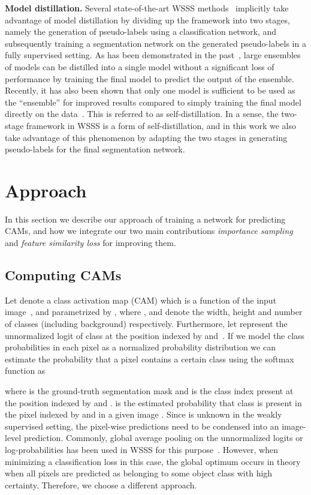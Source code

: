\documentclass{article}
\begin{document}
\textbf{Model distillation.} Several state-of-the-art WSSS methods~\cite{wang2020cvpr, lee2019cvpr, liu2020tpami} implicitly take advantage of model distillation by dividing up the framework into two stages, namely the generation of pseudo-labels using a classification network, and subsequently training a segmentation network on the generated pseudo-labels in a fully supervised setting. As has been demonstrated in the past~\cite{bucilua2006sigkdd, hinton2015arxiv}, large ensembles of models can be distilled into a single model without a significant loss of performance by training the final model to predict the output of the ensemble. Recently, it has also been shown that only one model is sufficient to be used as the ``ensemble'' for improved results compared to simply training the final model directly on the data~\cite{allen2020arxiv}. This is referred to as self-distillation. In a sense, the two-stage framework in WSSS is a form of self-distillation, and in this work we also take advantage of this phenomenon by adapting the two stages in generating pseudo-labels for the final segmentation network.

\section{Approach}

In this section we describe our approach of training a network for predicting CAMs, and how we integrate our two main contributions \textit{importance sampling} and \textit{feature similarity loss} for improving them.

\subsection{Computing CAMs}
\label{sec_computing_cams}

Let  denote a class activation map (CAM) which is a function of the input image~, and parametrized by , where ,  and  denote the width, height and number of classes (including background) respectively. Furthermore, let  represent the unnormalized logit of class  at the position indexed by  and~. If we model the class probabilities in each pixel as a normalized probability distribution we can estimate the probability that a pixel contains a certain class  using the softmax function as

where  is the ground-truth segmentation mask and  is the class index present at the position indexed by  and .  is the estimated probability that class  is present in the pixel indexed by  and  in a given image . Since  is unknown in the weakly supervised setting, the pixel-wise predictions need to be condensed into an image-level prediction. Commonly, global average pooling on the unnormalized logits or log-probabilities has been used in WSSS for this purpose~\cite{wang2020cvpr, ahn2018cvpr}. However, when minimizing a classification loss in this case, the global optimum occurs in theory when all pixels are predicted as belonging to some object class with high certainty. Therefore, we choose a different approach.
\end{document}
